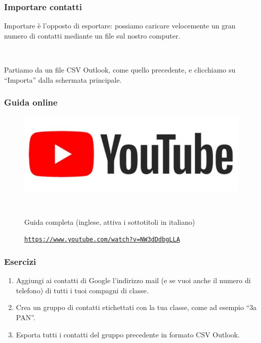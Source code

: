 \documentclass[handout]{beamer}
\begin{document}
\begin{frame}
\frametitle{Importare contatti}
Importare è l'opposto di esportare: possiamo caricare velocemente un gran numero di contatti mediante un \alert{file sul nostro computer}.\pause

~

Partiamo da un file CSV Outlook, come quello precedente, e clicchiamo su ``Importa'' dalla schermata principale.

\end{frame}




\begin{frame}
\frametitle{Guida online}
\begin{figure}
\includegraphics[width=.5\columnwidth]{img/ytlogo.jpg}

~

Guida completa (inglese, attiva i sottotitoli in italiano)

\href{https://www.youtube.com/watch?v=NW3dDdbgLLA}{\texttt{https://www.youtube.com/watch?v=NW3dDdbgLLA}}
\end{figure}
\end{frame}




\begin{frame}
\frametitle{Esercizi}
\begin{enumerate}
  \item Aggiungi ai contatti di Google l'indirizzo mail (e se vuoi anche il numero di telefono) di tutti i tuoi compagni di classe.
  \item Crea un gruppo di contatti etichettati con la tua classe, come ad esempio ``3a PAN''.
  \item Esporta tutti i contatti del gruppo precedente in formato CSV Outlook.
\end{enumerate}
\end{frame}
\end{document}
